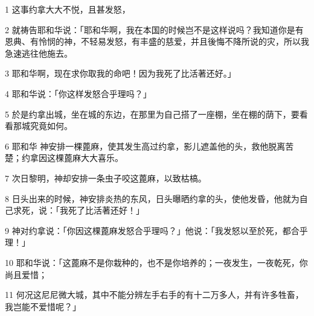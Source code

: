\par 1 这事约拿大大不悦，且甚发怒，
\par 2 就祷告耶和华说：「耶和华啊，我在本国的时候岂不是这样说吗？我知道你是有恩典、有怜悯的神，不轻易发怒，有丰盛的慈爱，并且後悔不降所说的灾，所以我急速逃往他施去。
\par 3 耶和华啊，现在求你取我的命吧！因为我死了比活著还好。」
\par 4 耶和华说：「你这样发怒合乎理吗？」
\par 5 於是约拿出城，坐在城的东边，在那里为自己搭了一座棚，坐在棚的荫下，要看看那城究竟如何。
\par 6 耶和华 神安排一棵蓖麻，使其发生高过约拿，影儿遮盖他的头，救他脱离苦楚；约拿因这棵蓖麻大大喜乐。
\par 7 次日黎明，神却安排一条虫子咬这蓖麻，以致枯槁。
\par 8 日头出来的时候，神安排炎热的东风，日头曝晒约拿的头，使他发昏，他就为自己求死，说：「我死了比活著还好！」
\par 9 神对约拿说：「你因这棵蓖麻发怒合乎理吗？」他说：「我发怒以至於死，都合乎理！」
\par 10 耶和华说：「这蓖麻不是你栽种的，也不是你培养的；一夜发生，一夜乾死，你尚且爱惜；
\par 11 何况这尼尼微大城，其中不能分辨左手右手的有十二万多人，并有许多牲畜，我岂能不爱惜呢？」


